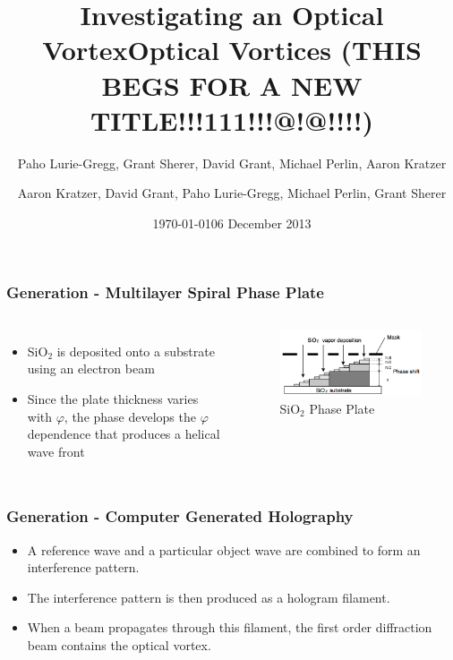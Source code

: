 \documentclass[xcolor=dvipsnames]{beamer}
\title{Investigating an Optical Vortex}
\author{Paho Lurie-Gregg, Grant Sherer, David Grant, Michael Perlin, Aaron Kratzer}
\date{\today}
\title{Optical Vortices (THIS BEGS FOR A NEW TITLE!!!111!!!@!@!!!!)}
\author{Aaron Kratzer, David Grant, Paho Lurie-Gregg,
  Michael Perlin, Grant Sherer}
\date{06 December 2013}
\newenvironment{items}[1][]
{\begin{itemize}
    \ifthenelse{\isempty{#1}}
    {\setlength{\itemsep}{12pt}}{\setlength{\itemsep}{#1}}}
  {\end{itemize}}
\renewcommand{\phi}{\varphi} %
\begin{document}
\begin{frame}
	\frametitle{Generation - Multilayer Spiral Phase Plate}
  \begin{columns}[c]
    \column{2.5in}
    \begin{items}
    \item SiO$_2$ is deposited onto a substrate using an electron beam
    \item Since the plate thickness varies with $\phi$, the phase
      develops the $\phi$ dependence that produces a helical wave
      front
    \end{items}
    \column{2in}
    \begin{figure}
      \includegraphics[width=\columnwidth]{MSPP.jpg}
      \caption{SiO$_2$ Phase Plate}
      \label{MSPP}
    \end{figure}
  \end{columns}
\end{frame}

\begin{frame}
	\frametitle{Generation - Computer Generated Holography}
  \begin{items}
  \item A reference wave and a particular object wave are combined to
    form an interference pattern.
  \item The interference pattern is then produced as a hologram
    filament.
  \item When a beam propagates through this filament, the first order
    diffraction beam contains the optical vortex.
  \end{items}
\end{frame}

\end{document}
